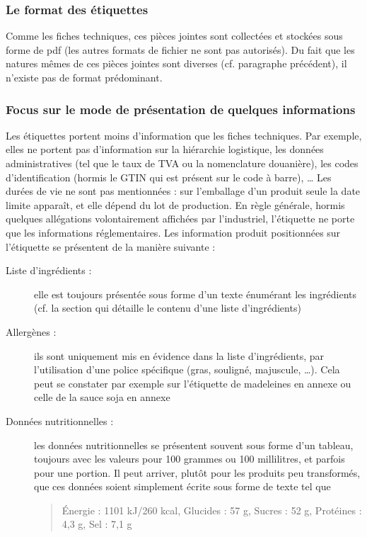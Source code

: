            \subsubsection{Le format des étiquettes}
            Comme les fiches techniques, ces pièces jointes sont collectées et stockées sous forme de pdf (les autres formats de fichier ne sont pas autorisés).
            Du fait que les natures mêmes de ces pièces jointes sont diverses (cf. paragraphe précédent), il n'existe pas de format prédominant.

            \subsubsection{Focus sur le mode de présentation de quelques informations}
            Les étiquettes portent moins d'information que les fiches techniques.
            Par exemple, elles ne portent pas d'information sur la hiérarchie logistique, les données administratives (tel que le taux de TVA ou la nomenclature douanière), les codes d'identification (hormis le GTIN qui est présent sur le code à barre), \dots
            Les durées de vie ne sont pas mentionnées : sur l'emballage d'un produit seule la date limite apparaît, et elle dépend du lot de production.
            En règle générale, hormis quelques allégations volontairement affichées par l'industriel, l'étiquette ne porte que les informations réglementaires.
            Les information produit positionnées sur l'étiquette se présentent de la manière suivante :
            \begin{description}
                \item[Liste d'ingrédients : ] elle est toujours présentée sous forme d'un texte énumérant les ingrédients (cf. la section  qui détaille le contenu d'une liste d'ingrédients)
                \item[Allergènes : ] ils sont uniquement mis en évidence dans la liste d'ingrédients, par l'utilisation d'une police spécifique (gras, souligné, majuscule, \dots). Cela peut se constater par exemple sur l'étiquette de madeleines en annexe  ou celle de la sauce soja en annexe 
                \item[Données nutritionnelles : ] les données nutritionnelles se présentent souvent sous forme d'un tableau, toujours avec les valeurs pour 100 grammes ou 100 millilitres, et parfois pour une portion.
                Il peut arriver, plutôt pour les produits peu transformés, que ces données soient simplement écrite sous forme de texte tel que \begin{quote}\'{E}nergie : 1101 kJ/260 kcal, Glucides : 57 g, Sucres : 52 g, Protéines : 4,3 g, Sel : 7,1 g\end{quote} 
            \end{description}           

